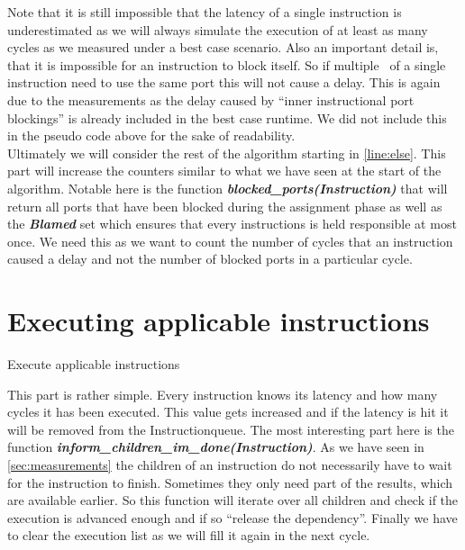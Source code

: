 Note that it is still impossible that the latency of a single instruction is underestimated as we will always simulate the execution of at least as many cycles as we measured under a best case scenario. Also an important detail is, that it is impossible for an instruction to block itself. So if multiple \microops\ of a single instruction need to use the same port this will not cause a delay. This is again due to the measurements as the delay caused by ``inner instructional port blockings'' is already included in the best case runtime. We did not include this in the pseudo code above for the sake of readability.\\

Ultimately we will consider the rest of the algorithm starting in \autoref{line:else}. This part will increase the counters similar to what we have seen at the start of the algorithm. Notable here is the function \textbf{\emph{blocked\_ports(Instruction)}} that will return all ports that have been blocked during the assignment phase as well as the \textbf{\emph{Blamed}} set which ensures that every instructions is held responsible at most once. We need this as we want to count the number of cycles that an instruction caused a delay and not the number of blocked ports in a particular cycle.



\section{Executing applicable instructions}
\label{sec:execute}

\begin{algorithm}[H]
    \SetAlgoLined
    \caption{Execute applicable instructions}
    \label{alg:execute}
\end{algorithm}
\newpage

This part is rather simple. Every instruction knows its latency and how many cycles it has been executed. This value gets increased and if the latency is hit it will be removed from the Instructionqueue. The most interesting part here is the function \textbf{\emph{inform\_children\_im\_done(Instruction)}}. As we have seen in \autoref{sec:measurements} the children of an instruction do not necessarily have to wait for the instruction to finish. Sometimes they only need part of the results, which are available earlier. So this function will iterate over all children and check if the execution is advanced enough and if so ``release the dependency''. Finally we have to clear the execution list as we will fill it again in the next cycle.

